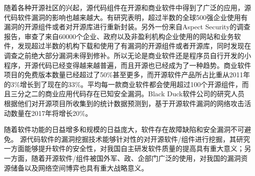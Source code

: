 


随着各种开源社区的兴起，源代码组件在开源和商业软件中得到了广泛的应用，源代码软件漏洞的影响也越来越大。有研究表明，超过半数的全球500强企业使用有漏洞的开源组件或者对开源库进行重新封装。另外一份来自Aspect Security的调查报告，审查了来自60000个企业、政府以及非盈利机构企业使用的网站和业务软件，发现超过半数的机构下载和使用了有漏洞的开源组件或者开源库，同时发现在调查之前绝大部分漏洞未得到修补。所以无论是商业软件还是程序员自行开发的小程序，开源代码已经变得越来越普遍，而且开源也已经成为了一种趋势。商业软件项目的免费版本数量已经超过了50\%甚至更多，而开源软件产品所占比重从2011年的3\%增长到了现在的33\%。平均每一款商业软件都会使用超过100个开源组件，而且三分之二的商业应用代码存在已知安全漏洞。Black Duck软件公司的研究人员根据他们对开源项目所收集到的统计数据预测到，基于开源软件漏洞的网络攻击活动数量在2017年将增长20\%。

随着软件功能的日益增多和规模的日益庞大，软件存在故障缺陷和安全漏洞不可避免。
源代码软件的漏洞挖掘技术能够针对性的对开源软件/组件进行挖掘，其研究一方面能够提升软件的安全性，对我国自主研发软件质量的提高具有重大意义；另一方面，随着开源软件/组件被国外军、政、企部门广泛的使用，对我国的漏洞资源储备以及网络空间博弈也具有重大战略意义。

